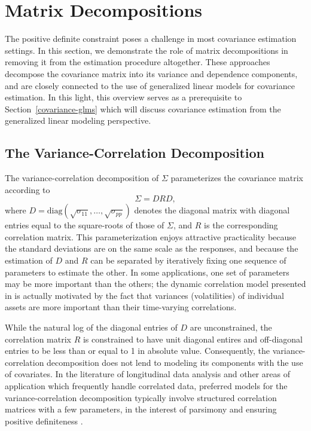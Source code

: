 

\section{Matrix Decompositions} \label{chapter-1-matrix-decompositions}


The positive definite constraint poses a challenge in most covariance estimation settings. In this section, we demonstrate the role of matrix decompositions in removing it from the estimation procedure altogether. These approaches decompose the covariance matrix into its variance and dependence components, and are closely connected to the use of generalized linear models for covariance estimation. In this light, this overview serves as a prerequisite to Section~\ref{covariance-glms} which will discuss covariance estimation from the generalized linear modeling perspective. 


\subsection{The Variance-Correlation Decomposition}

The variance-correlation decomposition of $\Sigma$  parameterizes the covariance matrix according to
\begin{equation}\label{eq:variance-correlation-decomposition}
\Sigma = DRD,
\end{equation}
\noindent
where $D = \mbox{diag}\left(\sqrt{\sigma_{11}},\dots , \sqrt{\sigma_{pp}}\right)$ denotes the diagonal matrix with diagonal entries equal to the square-roots of those of $\Sigma$, and $R$ is the corresponding correlation matrix. This parameterization enjoys attractive practicality because the standard deviations are on the same scale as the responses, and because the estimation of $D$ and $R$ can be separated by iteratively fixing one sequence of parameters to estimate the other. In some applications, one set of parameters may be more important than the others; the dynamic correlation model presented in \cite{engle2002dynamic} is actually motivated by the fact that variances (volatilities) of individual assets are more important than their time-varying correlations.

\bigskip

While the natural log of the diagonal entries of $D$ are unconstrained, the correlation matrix $R$ is constrained to have unit diagonal entires and off-diagonal entries to be less than or equal to 1 in absolute value. Consequently, the variance-correlation decomposition does not lend to modeling its components with the use of covariates. In the literature of longitudinal data analysis and other areas of application which frequently handle correlated data, preferred models for the variance-correlation decomposition typically involve structured correlation matrices with a few parameters, in the interest of parsimony and ensuring positive definiteness \citep{zimmerman1997structured}.


